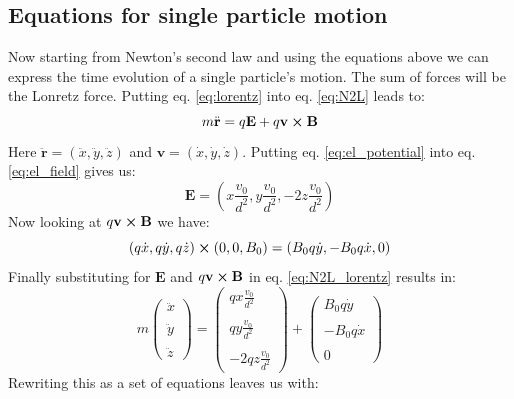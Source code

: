 \documentclass[english,notitlepage,reprint,nofootinbib]{revtex4-1}  %
\begin{document}
\subsection*{Equations for single particle motion}
Now starting from Newton's second law and using the equations above we can express the time evolution of a single particle's motion.
The sum of forces will be the Lonretz force. Putting eq. \ref{eq:lorentz} into eq. \ref{eq:N2L} leads to:
\begin{equation}\label{eq:N2L_lorentz}
    m \ddot{\textbf{r}} = q\textbf{E} + q \textbf{v} \cross \textbf{B}
\end{equation}
Here $\ddot{\textbf{r}} = (\ddot{x},\ddot{y},\ddot{z})$ and $\textbf{v} = (\dot{x},\dot{y},\dot{z})$. Putting eq. \ref{eq:el_potential} into eq. \ref{eq:el_field} gives us:
\begin{equation}\label{eq:el_calculated}
    \textbf{E} = \left( x \frac{v_0}{d^2}, y \frac{v_0}{d^2}, -2z \frac{v_0}{d^2} \right)
\end{equation}
Now looking at $q \textbf{v} \cross \textbf{B}$ we have:
\begin{equation}\label{eq:cross_calculated}
    (q \dot{x},q \dot{y},q \dot{z}) \cross (0, 0, B_0) = (B_0 q \dot{y}, -B_0 q \dot{x}, 0)
\end{equation}
Finally substituting for $\textbf{E}$ and $q \textbf{v} \cross \textbf{B}$ in eq. \ref{eq:N2L_lorentz} results in:
\begin{equation*}
    m \begin{pmatrix}
        \ddot{x} \\ \\ \ddot{y} \\ \\ \ddot{z}
    \end{pmatrix}
    = \begin{pmatrix}
        q x \frac{v_0}{d^2} \\ \\ q y \frac{v_0}{d^2} \\ \\ -2 q z \frac{v_0}{d^2}
    \end{pmatrix}
    + \begin{pmatrix}
        B_0 q \dot{y} \\ \\ -B_0 q \dot{x} \\ \\ 0
    \end{pmatrix}
\end{equation*}
Rewriting this as a set of equations leaves us with:
\end{document}
